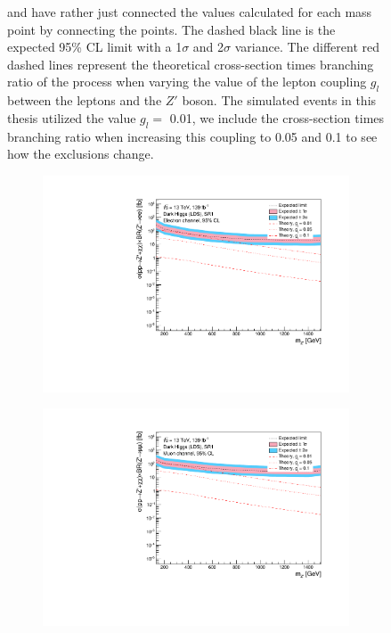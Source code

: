 \documentclass[12pt, a4paper]{book}
\begin{document}
\begin{figure}[!ht]
{   and have rather just connected the values calculated for each mass point by connecting the points. The dashed black line is the expected 95\% CL limit with a 1$\sigma$ and 2$\sigma$ variance. 
   The different red dashed lines represent the theoretical cross-section times branching ratio of the process when varying the value of the lepton coupling $g_l$ between the leptons and the $Z'$ boson. The simulated events in this thesis utilized the value $g_l=$ 0.01, we include the cross-section times branching ratio when increasing this coupling to 0.05 and 0.1 to see how the exclusions change.  }\label{fig:DH_LDS_exclusion_ee_uu}
\end{figure}

\begin{figure}[!ht]
	\centering
	\begin{subfigure}[b]{0.49\textwidth}
      \centering
      \includegraphics[width=1\textwidth]{Limits/Model_independent/50-100/DH_LDS/mass_exclusion_ee.pdf}
   \end{subfigure}
   \hfill
   \begin{subfigure}[b]{0.49\textwidth}
      \centering
      \includegraphics[width=1\textwidth]{Limits/Model_independent/50-100/DH_LDS/mass_exclusion_uu.pdf}

\end{subfigure}
\end{figure}
\end{document}

